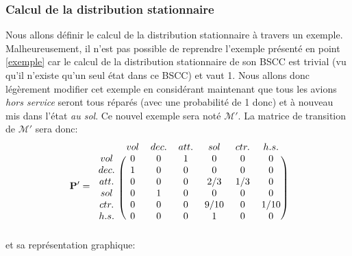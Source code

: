 \documentclass[letterpaper]{article}
\newcommand{\colornode}[1][]{\node[state,
	    align=center,
	    text=gray!40!black,
	    draw=gray,
	    fill=gray!20!white,{#1}]}
\newcommand{\bigcolornode}[1][]{\node[state,
	    align=center,
	    text=gray!40!black,
	    draw=gray,
	    fill=gray!20!white,
	    text width=1.7cm,{#1}]}
\newcommand{\drawedge}{\draw[every loop, line width=0.4mm, fill=gray, draw=gray]}
\begin{document}
    \subsubsection{Calcul de la distribution stationnaire}
      Nous allons définir le calcul de la distribution stationnaire à travers
      un exemple.  Malheureusement, il n'est pas possible de reprendre l'exemple
      présenté en point \ref{exemple} car le calcul de la distribution stationnaire
      de son BSCC est trivial (vu qu'il n'existe qu'un seul état dans ce BSCC) et vaut 1. 
      Nous allons donc légèrement modifier cet exemple en considérant maintenant
      que tous les avions \textit{hors service} seront tous réparés (avec une
      probabilité de 1 donc) et à nouveau mis dans l'état \textit{au sol}.
      Ce nouvel exemple sera noté $\mathcal{M}'$.
      La matrice de transition de $\mathcal{M}'$ sera donc:
      $$ \mathbf{P}' = 
	\begin{blockarray}{ccccccc}
	& vol & dec. & att. & sol & ctr. & h.s. \\
	  \begin{block}{c(cccccc)}
	    vol  & 0 & 0 & 1 & 0    & 0   & 0    \\
	    dec. & 1 & 0 & 0 & 0    & 0   & 0    \\
	    att. & 0 & 0 & 0 & 2/3  & 1/3 & 0    \\
	    sol  & 0 & 1 & 0 & 0    & 0   & 0    \\
	    ctr. & 0 & 0 & 0 & 9/10 & 0   & 1/10 \\
	    h.s. & 0 & 0 & 0 & 1    & 0   & 0    \\
	  \end{block}
	\end{blockarray}
      $$
      et sa représentation graphique:
      \begin{center}
      \end{center}
\end{document}
